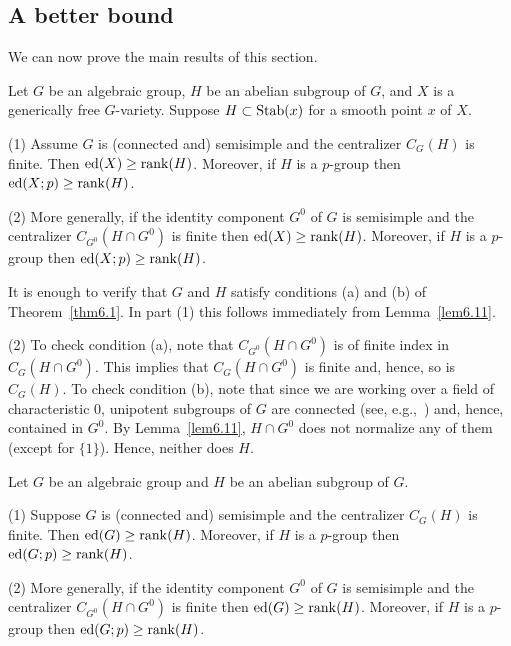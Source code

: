 \subsection*{A better bound}

We can now prove the main results of this section.

\begin{thm} \label{thm5-5}
Let $G$ be an algebraic group, $H$ be an abelian subgroup of $G$,
and $X$ is a generically free $G$-variety. Suppose $H \subset \operatorname{Stab}(x)$ for
a smooth point $x$ of $X$.

\smallskip
(1) Assume $G$ is (connected and) semisimple and the centralizer $C_G(H)$ 
is finite. Then $\operatorname{ed}(X) \geq \operatorname{rank}(H)$. Moreover, if $H$ is a $p$-group then
$\operatorname{ed}(X; p) \geq \operatorname{rank}(H)$. 

\smallskip
(2) More generally, if the identity component $G^0$ of $G$ is semisimple
and the centralizer $C_{G^0}(H \cap G^0)$ is finite then $\operatorname{ed}(X) \geq 
\operatorname{rank}(H)$. Moreover, if $H$ is a $p$-group then
$\operatorname{ed}(X; p) \geq \operatorname{rank} (H)$. 
\end{thm}

\begin{pf} It is enough to verify that $G$ and $H$ satisfy conditions
(a) and (b) of Theorem~\ref{thm6.1}. In part (1) this follows immediately 
from Lemma~\ref{lem6.11}. 

(2) To check condition (a), note that $C_{G^0}(H \cap G^0)$ is of 
finite index in $C_{G}(H \cap G^0)$. This implies that $C_G(H \cap G^0)$ 
is finite and, hence, so is $C_G(H)$. To check condition (b),
note that since we are working over a field of characteristic 0, unipotent 
subgroups of $G$ are connected (see, e.g.,~\cite[3.2.2, Corollary 2]{ov}) 
and, hence, contained in $G^0$. 
By Lemma~\ref{lem6.11}, $H \cap G^0$ does not normalize any of 
them (except for $\{ 1 \}$). Hence, neither does $H$.
\end{pf} 


\begin{thm} \label{thm5-6}
Let $G$ be an algebraic group and $H$ be an abelian subgroup of $G$.

\smallskip
(1) Suppose $G$ is (connected and) semisimple and the centralizer $C_G(H)$ 
is finite. Then $\operatorname{ed}(G) \geq \operatorname{rank}(H)$. Moreover, if $H$ is a $p$-group then
$\operatorname{ed}(G; p) \geq \operatorname{rank}(H)$. 

\smallskip
(2) More generally, if the identity component $G^0$ of $G$ is semisimple
and the centralizer $C_{G^0}(H \cap G^0)$ is finite then $\operatorname{ed}(G) \geq 
\operatorname{rank}(H)$. Moreover, if $H$ is a $p$-group then
$\operatorname{ed}(G; p) \geq \operatorname{rank} (H)$. 
\end{thm}

